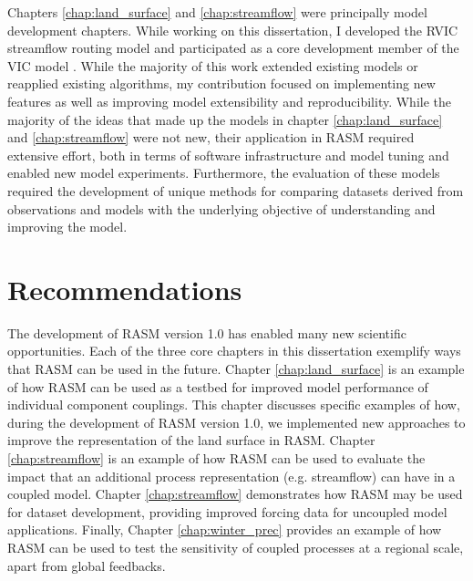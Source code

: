 Chapters \ref{chap:land_surface} and \ref{chap:streamflow} were principally model development chapters.
While working on this dissertation, I developed the RVIC streamflow routing model \citep[see also \ref{sec:rvic_dev} ;][]{Hamman_2015,Hamman_2016b} and participated as a core development member of the VIC model \citep[see also \ref{sec:vic_dev}]{Hamman_2016c,Hamman_2016d}.
While the majority of this work extended existing models or reapplied existing algorithms, my contribution focused on implementing new features as well as improving model extensibility and reproducibility.
While the majority of the ideas that made up the models in chapter \ref{chap:land_surface} and \ref{chap:streamflow} were not new, their application in RASM required extensive effort, both in terms of software infrastructure and model tuning and enabled new model experiments.
Furthermore, the evaluation of these models required the development of unique methods for comparing datasets derived from observations and models with the underlying objective of understanding and improving the model.

\section{Recommendations}
The development of RASM version 1.0 has enabled many new scientific opportunities.
Each of the three core chapters in this dissertation exemplify ways that RASM can be used in the future.
Chapter \ref{chap:land_surface} is an example of how RASM can be used as a testbed for improved model performance of individual component couplings.
This chapter discusses specific examples of how, during the development of RASM version 1.0, we implemented new approaches to improve the representation of the land surface in RASM.
Chapter \ref{chap:streamflow} is an example of how RASM can be used to evaluate the impact that an additional process representation (e.g. streamflow) can have in a coupled model.
Chapter \ref{chap:streamflow} demonstrates how RASM may be used for dataset development, providing improved forcing data for uncoupled model applications.
Finally, Chapter \ref{chap:winter_prec} provides an example of how RASM can be used to test the sensitivity of coupled processes at a regional scale, apart from global feedbacks.

